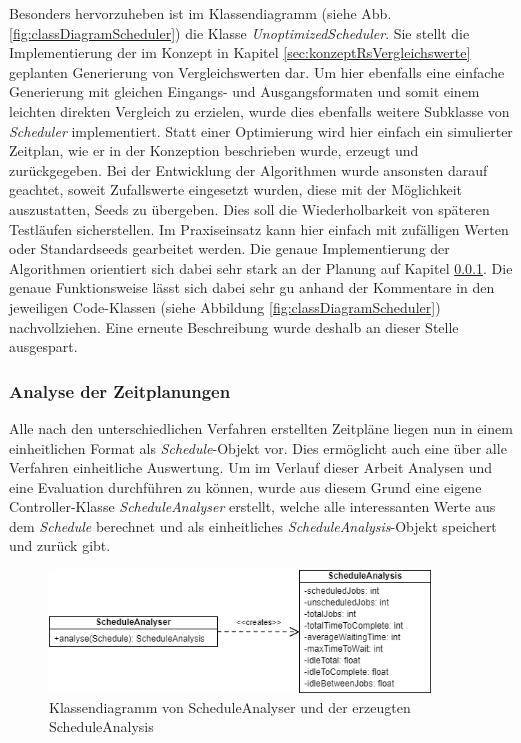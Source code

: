 Besonders hervorzuheben ist im Klassendiagramm (siehe Abb. \ref{fig:classDiagramScheduler}) die Klasse \textit{UnoptimizedScheduler}. Sie stellt die Implementierung der im Konzept in Kapitel \ref{sec:konzeptRsVergleichswerte} geplanten Generierung von Vergleichswerten dar. Um hier ebenfalls eine einfache Generierung mit gleichen Eingangs- und Ausgangsformaten und somit einem leichten direkten Vergleich zu erzielen, wurde dies ebenfalls weitere Subklasse von \textit{Scheduler} implementiert. Statt einer Optimierung wird hier einfach ein simulierter Zeitplan, wie er in der Konzeption beschrieben wurde, erzeugt und zurückgegeben. Bei der Entwicklung der Algorithmen wurde ansonsten darauf geachtet, soweit Zufallswerte eingesetzt wurden, diese mit der Möglichkeit auszustatten, Seeds zu übergeben. Dies soll die Wiederholbarkeit von späteren Testläufen sicherstellen. Im Praxiseinsatz kann hier einfach mit zufälligen Werten oder Standardseeds gearbeitet werden. Die genaue Implementierung der Algorithmen orientiert sich dabei sehr stark an der Planung auf Kapitel \ref{}. Die genaue Funktionsweise lässt sich dabei sehr gu anhand der Kommentare in den jeweiligen Code-Klassen (siehe Abbildung \ref{fig:classDiagramScheduler}) nachvollziehen. Eine erneute Beschreibung wurde deshalb an dieser Stelle ausgespart.


\subsubsection{Analyse der Zeitplanungen}

Alle nach den unterschiedlichen Verfahren erstellten Zeitpläne liegen nun in einem einheitlichen Format als \textit{Schedule}-Objekt vor. Dies ermöglicht auch eine über alle Verfahren einheitliche Auswertung. Um im Verlauf dieser Arbeit Analysen und eine Evaluation durchführen zu können, wurde aus diesem Grund eine eigene Controller-Klasse \textit{ScheduleAnalyser} erstellt, welche alle interessanten Werte aus dem \textit{Schedule} berechnet und als einheitliches \textit{ScheduleAnalysis}-Objekt speichert und zurück gibt. 

\begin{figure}[H]
    \centering
    \includegraphics[width=0.9\textwidth]{images/classDiagrams/ScheduleAnalyser_ClassDiagram.png}
    \caption{Klassendiagramm von ScheduleAnalyser und der erzeugten ScheduleAnalysis}
    \label{fig:classDiagramScheduleAnalyser}
\end{figure}


